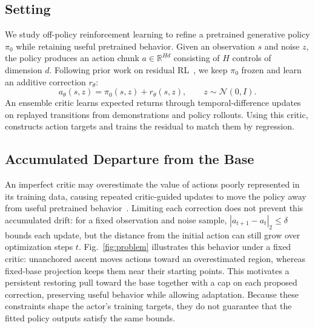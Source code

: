 \subsection{Setting}
We study off-policy reinforcement learning to refine a pretrained generative policy $\pi_0$ while retaining useful pretrained behavior. 
Given an observation $s$ and noise $z$, the policy produces an action chunk $a\in\mathbb{R}^{Hd}$ consisting of $H$ controls of dimension $d$. 
Following prior work on residual RL~\cite{johannink2019residual,ankile2025resfit,dicerl2026}, we keep $\pi_0$ frozen and learn an additive correction $r_\theta$:
\begin{equation}
  a_\theta(s,z)=\pi_0(s,z)+r_\theta(s,z),
  \qquad z\sim\mathcal{N}(0,I).
  \label{eq:residual}
\end{equation}
An ensemble critic learns expected returns through temporal-difference updates on replayed transitions from demonstrations and policy rollouts. 
Using this critic, \method{} constructs action targets and trains the residual to match them by regression.

\subsection{Accumulated Departure from the Base}
An imperfect critic may overestimate the value of actions poorly represented in its training data, causing repeated critic-guided updates to move the policy away from useful pretrained behavior~\cite{fujimoto2019bcq}. Limiting each correction does not prevent this accumulated drift: for a fixed observation and noise sample, $|a_{t+1}-a_t|_2\leq\delta$ bounds each update, but the distance from the initial action can still grow over optimization steps $t$. Fig.~\ref{fig:problem} illustrates this behavior under a fixed critic: unanchored ascent moves actions toward an overestimated region, whereas fixed-base projection keeps them near their starting points. This motivates a persistent restoring pull toward the base together with a cap on each proposed correction, preserving useful behavior while allowing adaptation. Because these constraints shape the actor's training targets, they do not guarantee that the fitted policy outputs satisfy the same bounds.



